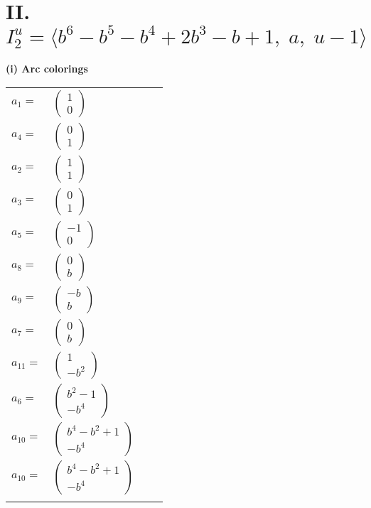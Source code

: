 \documentclass[1p]{elsarticle_modified}
\theoremstyle{definition}
\begin{document}
\centering \section*{II. $I^u_{2}= \langle b^6- b^5- b^4+2 b^3- b+1,\;a,\;u-1 \rangle$}
\flushleft \textbf{(i) Arc colorings}\\
\begin{tabular}{m{7pt} m{180pt} m{7pt} m{180pt} }
\flushright $a_{1}=$&$\begin{pmatrix}1\\0\end{pmatrix}$ \\
\flushright $a_{4}=$&$\begin{pmatrix}0\\1\end{pmatrix}$ \\
\flushright $a_{2}=$&$\begin{pmatrix}1\\1\end{pmatrix}$ \\
\flushright $a_{3}=$&$\begin{pmatrix}0\\1\end{pmatrix}$ \\
\flushright $a_{5}=$&$\begin{pmatrix}-1\\0\end{pmatrix}$ \\
\flushright $a_{8}=$&$\begin{pmatrix}0\\b\end{pmatrix}$ \\
\flushright $a_{9}=$&$\begin{pmatrix}- b\\b\end{pmatrix}$ \\
\flushright $a_{7}=$&$\begin{pmatrix}0\\b\end{pmatrix}$ \\
\flushright $a_{11}=$&$\begin{pmatrix}1\\- b^2\end{pmatrix}$ \\
\flushright $a_{6}=$&$\begin{pmatrix}b^2-1\\- b^4\end{pmatrix}$ \\
\flushright $a_{10}=$&$\begin{pmatrix}b^4- b^2+1\\- b^4\end{pmatrix}$\\ \flushright $a_{10}=$&$\begin{pmatrix}b^4- b^2+1\\- b^4\end{pmatrix}$\\&\end{tabular}
\end{document}
